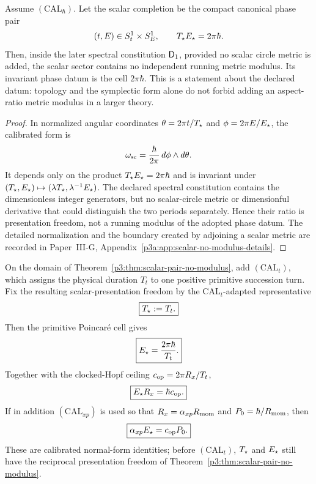 \documentclass[12pt,a4paper]{article}
\begin{document}
\begin{theorem}
\label{p3:thm:scalar-pair-no-modulus}
Assume $(\mathrm{CAL}_{\hbar})$.  Let the scalar completion be the compact canonical phase pair
\[
(t,E)\in S^1_t\times S^1_E,
\qquad T_\star E_\star=2\pi\hbar .
\]
Then, inside the later spectral constitution \(\mathsf{D}_1\), provided no scalar
circle metric is added, the scalar sector contains no independent running
metric modulus.  Its invariant phase datum is the cell \(2\pi\hbar\).
This is a statement about the declared datum: topology and the symplectic form
alone do not forbid adding an aspect-ratio metric modulus in a larger theory.
\end{theorem}

\begin{proof}
In normalized angular coordinates
\(\theta=2\pi t/T_\star\) and \(\phi=2\pi E/E_\star\), the calibrated form is
\[
 \omega_{\rm sc}=\frac{\hbar}{2\pi}\,d\phi\wedge d\theta .
\]
It depends only on the product
\(T_\star E_\star=2\pi\hbar\) and is invariant under
\((T_\star,E_\star)\mapsto(\lambda T_\star,\lambda^{-1}E_\star)\).  The declared
spectral constitution contains the dimensionless integer generators, but no
scalar-circle metric or dimensionful derivative that could distinguish the
two periods separately.  Hence their ratio is presentation freedom, not a
running modulus of the adopted phase datum.  The detailed normalization and
the boundary created by adjoining a scalar metric are recorded in
Paper~III-G, Appendix~\ref{p3a:app:scalar-no-modulus-details}.
\end{proof}

\begin{corollary}
\label{p3a:cor:calibrated-scalar-m8-scale-chain}
On the domain of Theorem~\ref{p3:thm:scalar-pair-no-modulus}, add
\((\mathrm{CAL}_t)\), which assigns the physical duration \(T_t\) to one
positive primitive succession turn.  Fix the resulting scalar-presentation
freedom by the CAL\(_t\)-adapted representative
\[
 \boxed{T_\star:=T_t.}
\]
Then the primitive Poincar\'e cell gives
\[
 \boxed{E_\star=\frac{2\pi\hbar}{T_t}.}
\]
Together with the clocked-Hopf ceiling
\(c_{\rm op}=2\pi R_x/T_t\),
\[
 \boxed{E_\star R_x=\hbar c_{\rm op}.}
\]
If in addition \((\mathrm{CAL}_{xp})\) is used so that
\(R_x=\alpha_{xp}R_{\mathrm{mom}}\) and \(P_{0}=\hbar/R_{\mathrm{mom}}\), then
\[
 \boxed{\alpha_{xp}E_\star=c_{\rm op}P_{0}.}
\]
These are calibrated normal-form identities; before \((\mathrm{CAL}_t)\),
\(T_\star\) and \(E_\star\) still have the reciprocal presentation freedom of
Theorem~\ref{p3:thm:scalar-pair-no-modulus}.
\end{corollary}
\end{document}
